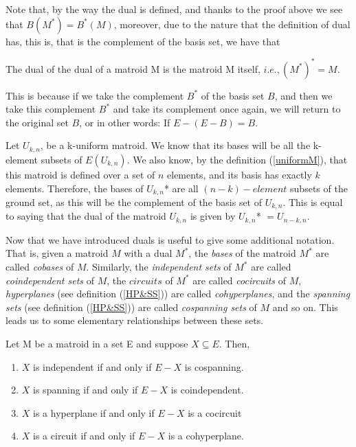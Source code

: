 Note that, by the way the dual is defined, and thanks to the proof above we see that $B(M^*)=B^*(M)$, moreover, due to the nature that the definition of dual has, this is, that is the complement of the basis set, we have that

\begin{lemma}
    The dual of the dual of a matroid M is the matroid M itself, $i.e., (M^*)^* = M$.
\end{lemma}

This is because if we take the complement $B^*$ of the basis set $B$, and then we take this complement $B^*$ and take its complement once again, we will return to the original set $B$, or in other words: If $E-(E - B) = B$.

\begin{exmp}
    Let $U_{k,n}$, be a k-uniform matroid. We know that its bases will be all the k-element subsets of $E(U_{k,n})$. We also know, by the definition (\ref{uniformM}), that this matroid is defined over a set of $n$ elements, and its basis has exactly $k$ elements. Therefore, the bases of $U_{k,n}$* are all $(n-k)-element$ subsets of the ground set, as this will be the complement of the basis set of $U_{k,n}$. This is equal to saying that the dual of the matroid $U_{k,n}$ is given by $U_{k,n}$* $= U_{n-k,n}$.
\end{exmp}

Now that we have introduced duals is useful to give some additional notation. That is, given a matroid $M$ with a dual $M^*$, the \textit{bases} of the matroid $M^*$ are called \textit{cobases} of $M$. Similarly, the \textit{independent sets} of $M^*$ are called \textit{coindependent sets} of $M$, the $circuits$ of $M^*$ are called \textit{cocircuits} of $M$, \textit{hyperplanes} (see definition (\ref{HP&SS})) are called \textit{cohyperplanes}, and the \textit{spanning sets} (see definition (\ref{HP&SS})) are called \textit{cospanning sets} of $M$ and so on. This leads us to some elementary relationships between these sets. 

\begin{theorem}\label{propositionsofdualrelations}
    Let M be a matroid in a set E and suppose $X \subseteq E$. Then,
    \begin{enumerate}
        \item $X$ is independent if and only if $E-X$ is cospanning.

        \item $X$ is spanning if and only if $E-X$ is coindependent.

        \item $X$ is a hyperplane if and only if $E-X$ is a cocircuit

        \item $X$ is a circuit if and only if $E-X$ is a cohyperplane.
    \end{enumerate}
\end{theorem} 

